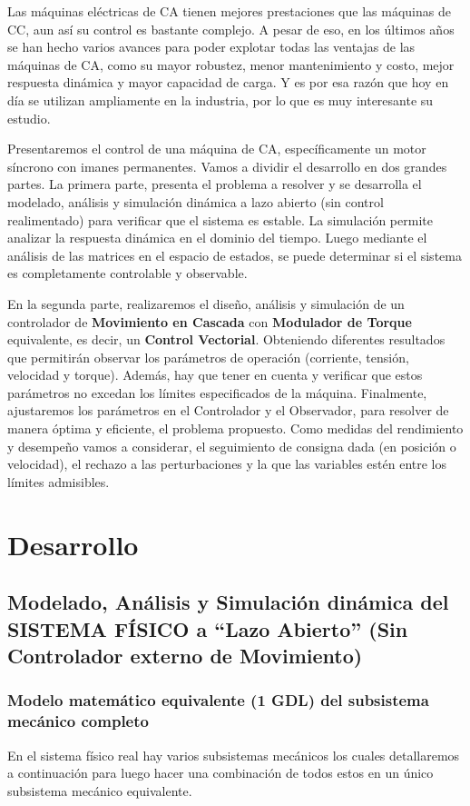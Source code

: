 \documentclass[10pt]{article}
\begin{document}
Las máquinas eléctricas de CA tienen mejores prestaciones que las máquinas de CC, aun así su control es bastante complejo.
A pesar de eso, en los últimos años se han hecho varios avances para poder explotar todas las ventajas de las máquinas de CA, como su mayor robustez, menor mantenimiento y costo, mejor respuesta dinámica y mayor capacidad de carga.
Y es por esa razón que hoy en día se utilizan ampliamente en la industria, por lo que es muy interesante su estudio.
\\
\par
Presentaremos el control de una máquina de CA, específicamente un motor síncrono con imanes permanentes.
Vamos a dividir el desarrollo en dos grandes partes.
La primera parte, presenta el problema a resolver y se desarrolla el modelado, análisis y simulación dinámica a lazo abierto (sin control realimentado) para verificar que el sistema es estable.
La simulación permite analizar la respuesta dinámica en el dominio del tiempo.
Luego mediante el análisis de las matrices en el espacio de estados, se puede determinar si el sistema es completamente controlable y observable.
\\
\par
En la segunda parte, realizaremos el diseño, análisis y simulación de un controlador de \textbf{Movimiento en Cascada} con \textbf{Modulador de Torque} equivalente, es decir, un \textbf{Control Vectorial}.
Obteniendo diferentes resultados que permitirán observar los parámetros de operación (corriente, tensión, velocidad y torque).
Además, hay que tener en cuenta y verificar que estos parámetros no excedan los límites especificados de la máquina.
Finalmente, ajustaremos los parámetros en el Controlador y el Observador, para resolver de manera óptima y eficiente, el problema propuesto.
Como medidas del rendimiento y desempeño vamos a considerar, el seguimiento de consigna dada (en posición o velocidad), el rechazo a las perturbaciones y la que las variables estén entre los límites admisibles.

\section{Desarrollo}
\subsection{Modelado, Análisis y Simulación dinámica del SISTEMA FÍSICO a “Lazo Abierto” (Sin Controlador externo de Movimiento)}
\subsubsection{Modelo matemático equivalente (1 GDL) del subsistema mecánico completo}
En el sistema físico real hay varios subsistemas mecánicos los cuales detallaremos a continuación para luego hacer una combinación de todos estos en un único subsistema mecánico equivalente.
\end{document}
